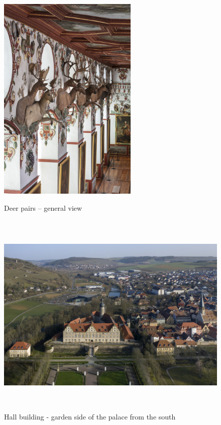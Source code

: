 \documentclass[
  a4paper,
]{book}
\begin{document}
\begin{figure}
\includegraphics[height=10cm]{images/fmd10005866a.jpg}

\caption{Deer pairs – general view}
\label{fig:{images/fmd10005866a.jpg}}

\clearpage

\centering

\includegraphics[height=10cm]{images/fmd10024321a.jpg}

\caption{Hall building - garden side of the palace from the south}
\label{fig:{images/fmd10024321a.jpg}}

\clearpage

\centering


\end{figure}
\end{document}

